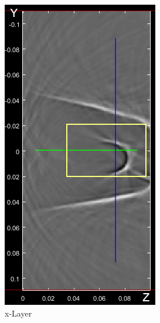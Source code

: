 \begin{figure}[H]
     \centering
     \begin{subfigure}[b]{0.49\textwidth}
         \centering
        \includegraphics[width=0.59\linewidth]{Graphics/Results/Olive_Standart_reco_example/olive_standart_reconstruction_whole_volume_x_layer.png}
         \caption{x-Layer}
         \label{fig:res:reflec_image_olive_xyz_x}
     \end{subfigure}
     \hfill
     \begin{subfigure}[b]{0.49\textwidth}
         \centering

\end{subfigure}
\end{figure}
